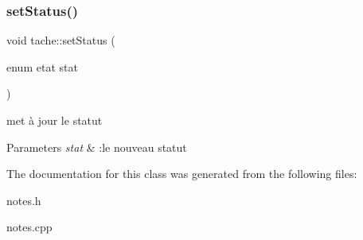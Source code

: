 \subsubsection{\texorpdfstring{set\+Status()}{setStatus()}}
{\footnotesize\ttfamily void tache\+::set\+Status (\begin{DoxyParamCaption}\item[{enum etat}]{stat }\end{DoxyParamCaption})\hspace{0.3cm}{\ttfamily [inline]}}



met à jour le statut 


\begin{DoxyParams}{Parameters}
{\em stat} & \+:le nouveau statut \\
\hline
\end{DoxyParams}


The documentation for this class was generated from the following files\+:\begin{DoxyCompactItemize}
\item 
notes.\+h\item 
notes.\+cpp\end{DoxyCompactItemize}
